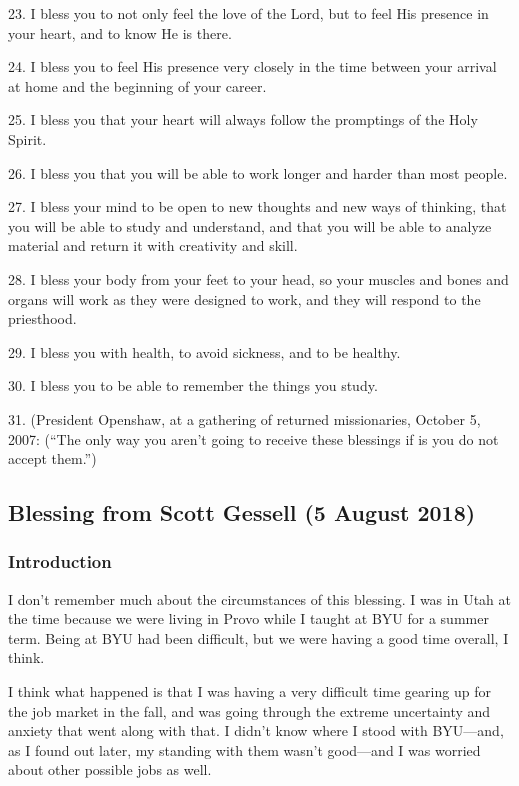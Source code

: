 			23. I bless you to not only feel the love of the Lord, but to feel His presence in your heart, and to know He is there.

			24. I bless you to feel His presence very closely in the time between your arrival at home and the beginning of your career.

			25. I bless you that your heart will always follow the promptings of the Holy Spirit.

			26. I bless you that you will be able to work longer and harder than most people.

			27. I bless your mind to be open to new thoughts and new ways of thinking, that you will be able to study and understand, and that you will be able to analyze material and return it with creativity and skill.

			28. I bless your body from your feet to your head, so your muscles and bones and organs will work as they were designed to work, and they will respond to the priesthood.

			29. I bless you with health, to avoid sickness, and to be healthy.

			30. I bless you to be able to remember the things you study.

			31. (President Openshaw, at a gathering of returned missionaries, October 5, 2007: (``The only way you aren't going to receive these blessings if is you do not accept them.'')

	\subsection{Blessing from Scott Gessell (5 August 2018)}
		\label{BLESSINGS-2018}
		
		\subsubsection{Introduction}
		
			I don't remember much about the circumstances of this blessing. I was in Utah at the time because we were living in Provo while I taught at BYU for a summer term. Being at BYU had been difficult, but we were having a good time overall, I think. 
			
			I think what happened is that I was having a very difficult time gearing up for the job market in the fall, and was going through the extreme uncertainty and anxiety that went along with that. I didn't know where I stood with BYU---and, as I found out later, my standing with them wasn't good---and I was worried about other possible jobs as well. 
			
